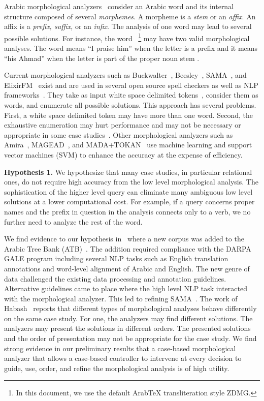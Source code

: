 \documentclass[12pt]{article}
\begin{document}
Arabic morphological analyzers~\cite{Sughaiyer:04}
consider an Arabic word and its internal structure composed of 
several {\em morphemes}. 
A morpheme is a {\em stem} or an {\em affix}.
An affix is a {\em prefix, suffix,} or an {\em infix}.
The analysis of one word may lead to several possible
solutions.
\vocalize
For instance, the word 
~\footnote{In this document, we use the default 
ArabTeX transliteration style ZDMG.}
may have two valid morphological analyses. 
The word means ``I praise him'' when
the letter  is a prefix and  it means
``his Ahmad'' when 
the letter  is part of the proper noun stem 
.
\novocalize

Current morphological analyzers such as 
Buckwalter~\cite{Buckwalter:02},
Beesley~\cite{Beesley:01}, SAMA~\cite{Kulick:10},
and ElixirFM~\cite{Otakar:07} exist
and are used in several open source spell checkers as 
well as NLP frameworks~\cite{Col09}.
They take as input white space delimited tokens~\cite{Kulick:10},
consider them as words,
and enumerate all possible solutions. 
This approach has several problems. 
First, a white space delimited token may have 
more than one word.
Second, the exhaustive enumeration may hurt performance and may
not be necessary or appropriate
in some case studies~\cite{Maamouri:10}. 
Other morphological analyzers such as 
Amira~\cite{Diab:07,Benajiba:07},
MAGEAD~\cite{Habash:05}, and MADA+TOKAN~\cite{Habash:09} 
use machine learning and support vector machines (SVM) 
to enhance the accuracy at the expense of efficiency.

{\bf Hypothesis 1.} We hypothesize that many case studies, 
in particular relational ones, 
do not require high accuracy from the 
low level morphological analysis.
The sophistication of the higher level query can eliminate 
many ambiguous low level solutions at a lower computational 
cost.
For example, if a query concerns proper names and the 
prefix in question in the analysis connects only to a verb, 
we no further need to analyze the rest of the word.

We find evidence to our hypothesis in~\cite{Maamouri:10} where 
a new corpus was added to the Arabic Tree Bank 
(ATB)~\cite{Maamouri:04}. 
The addition required compliance with the DARPA GALE program 
including several NLP tasks such as English translation 
annotations and word-level alignment of Arabic and English. 
The new genre of data challenged the existing data processing and 
annotation guidelines. 
Alternative guidelines came to place where the high level NLP 
task interacted with the morphological analyzer. 
This led to refining SAMA~\cite{Kulick:10}. 
The work of Habash~\cite{Habash:06} reports that different 
types of morphological analyses behave differently on the same case 
study. 
For one, the analyzers may find different solutions. 
The analyzers may present the solutions in different orders. 
The presented solutions and the order of presentation may not be 
appropriate for the case study. 
We find strong evidence in our preliminary results 
that a case-based morphological analyzer that allows a case-based 
controller to intervene at every decision to guide, use, order, and 
refine the morphological analysis is of high utility.
\end{document}

